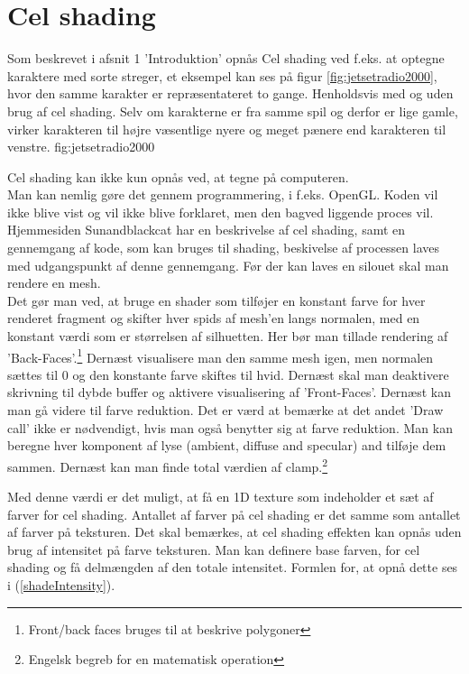 \newpage
\section{Cel shading}
Som beskrevet i afsnit 1 'Introduktion' opnås Cel shading ved f.eks. at optegne karaktere med sorte streger, et eksempel kan ses på figur \ref{fig:jetsetradio2000}, hvor den samme karakter er repræsentateret to gange. Henholdsvis med og uden brug af cel shading. Selv om karakterne er fra samme spil og derfor er lige gamle, virker karakteren til højre væsentlige nyere og meget pænere end karakteren til venstre. 
 {} {fig:jetsetradio2000}

Cel shading kan ikke kun opnås ved, at tegne på computeren.\\ Man kan nemlig gøre det gennem programmering, i f.eks. OpenGL. 
Koden vil ikke blive vist og vil ikke blive forklaret, men den bagved liggende proces vil. Hjemmesiden Sunandblackcat \cite{sunandblackcat2016} har en beskrivelse af cel shading, samt en gennemgang af kode, som kan bruges til shading, beskivelse af processen laves med udgangspunkt af denne gennemgang. Før der kan laves en silouet skal man rendere en mesh. \\
Det gør man ved, at bruge en shader som tilføjer en konstant farve for
hver renderet fragment og skifter hver spids af mesh’en langs normalen, med en konstant værdi
som er størrelsen af silhuetten. Her bør man tillade rendering af ’Back-Faces’.\footnote[1]
{Front/back faces bruges til at beskrive polygoner}
Dernæst visualisere man den samme mesh igen, men normalen sættes til 0 og den konstante farve
skiftes til hvid.
Dernæst skal man deaktivere skrivning til dybde buffer og aktivere
visualisering af ’Front-Faces’. Dernæst kan man gå videre til farve reduktion. Det er værd at
bemærke at det andet ’Draw call’ ikke er nødvendigt, hvis man også benytter sig at farve
reduktion. 
Man kan beregne hver komponent af lyse (ambient, diffuse and specular) and tilføje dem sammen.
Dernæst kan man finde total værdien af clamp.\footnote[2]{Engelsk begreb for en matematisk
operation}

Med denne værdi er det muligt, at få en 1D texture som indeholder et sæt af farver for cel
shading. Antallet af farver på cel shading er det samme som antallet af farver på teksturen.
Det skal bemærkes, at cel shading effekten kan opnås uden brug af intensitet på farve
teksturen. 
Man kan definere base farven, for cel shading og få delmængden af den totale intensitet. Formlen
for, at opnå dette ses i (\ref{shadeIntensity}).

